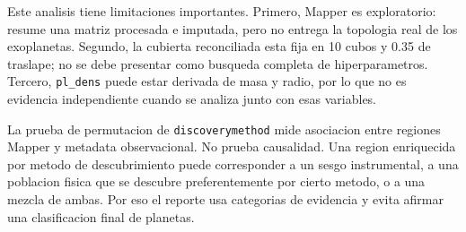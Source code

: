 Este analisis tiene limitaciones importantes. Primero, Mapper es exploratorio: resume una matriz procesada e imputada, pero no entrega la topologia real de los exoplanetas. Segundo, la cubierta reconciliada esta fija en 10 cubos y 0.35 de traslape; no se debe presentar como busqueda completa de hiperparametros. Tercero, \texttt{pl\_dens} puede estar derivada de masa y radio, por lo que no es evidencia independiente cuando se analiza junto con esas variables.

La prueba de permutacion de \texttt{discoverymethod} mide asociacion entre regiones Mapper y metadata observacional. No prueba causalidad. Una region enriquecida por metodo de descubrimiento puede corresponder a un sesgo instrumental, a una poblacion fisica que se descubre preferentemente por cierto metodo, o a una mezcla de ambas. Por eso el reporte usa categorias de evidencia y evita afirmar una clasificacion final de planetas.
